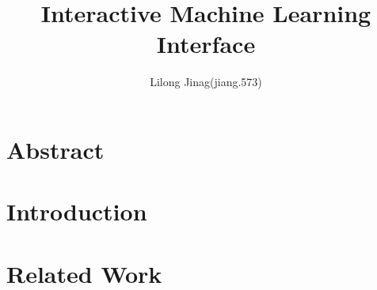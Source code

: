 \documentclass{article}
\begin{document}
\title{Interactive Machine Learning Interface}
\author{Lilong Jinag(jiang.573)}
\maketitle
\section{Abstract}
\section{Introduction}
\section{Related Work}


\end{document}

